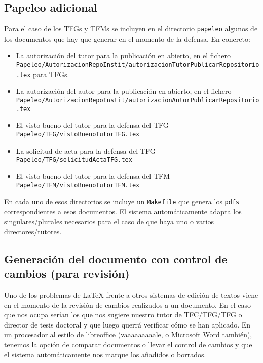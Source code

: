 {  \subsection{Papeleo adicional}
  \label{sec:introapp1}

  Para el caso de los TFGs y TFMs se incluyen en el directorio \texttt{papeleo} algunos de los documentos que hay que generar en el momento de la defensa. En concreto:

  \begin{itemize}
    \item La autorización del tutor para la publicación en abierto, en el fichero \texttt{Papeleo/AutorizacionRepoInstit/autorizacionTutorPublicarRepositorio.tex} para TFGs.
    \item La autorización del autor para la publicación en abierto, en el fichero \texttt{Papeleo/AutorizacionRepoInstit/autorizacionAutorPublicarRepositorio.tex}
    \item El visto bueno del tutor para la defensa del TFG \texttt{Papeleo/TFG/vistoBuenoTutorTFG.tex}
    \item La solicitud de acta para la defensa del TFG \texttt{Papeleo/TFG/solicitudActaTFG.tex}
    \item El visto bueno del tutor para la defensa del TFM \texttt{Papeleo/TFM/vistoBuenoTutorTFM.tex}
  \end{itemize}

  En cada uno de esos directorios se incluye un \texttt{Makefile} que genera los \texttt{pdfs} correspondientes a esos documentos. El sistema automáticamente adapta los singulares/plurales necesarios para el caso de que haya uno o varios directores/tutores.


  \subsection{Generación del documento con control de cambios (para revisión)}
  \label{sec:control-de-cambios}

  Uno de los problemas de \LaTeX{} frente a otros sistemas de edición de textos viene en el momento de la revisión de cambios realizados a un documento. En el caso que nos ocupa serían los que nos sugiere nuestro tutor de TFC/TFG/TFG o director de tesis doctoral y que luego querrá verificar cómo se han aplicado. En un procesador al estilo de libreoffice (vaaaaaaaaale, o Microsoft Word también), tenemos la opción de comparar documentos o llevar el control de cambios y que el sistema automáticamente nos marque los añadidos o borrados.

}
